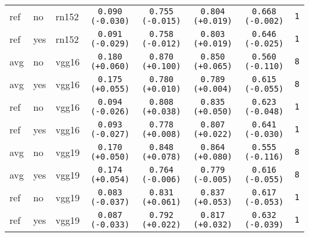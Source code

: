 \begin{tabular}{|l|l|l|c|c|c|c|c|}
ref & no & rn152 & \texttt{0.090} {\color{red}\texttt{(-0.030)}} & \texttt{0.755} {\color{green}\texttt{(-0.015)}} & \texttt{0.804} {\color{red}\texttt{(+0.019)}} & \texttt{0.668} {\color{black}\texttt{(-0.002)}} & \texttt{1}\\
ref & yes & rn152 & \texttt{0.091} {\color{red}\texttt{(-0.029)}} & \texttt{0.758} {\color{green}\texttt{(-0.012)}} & \texttt{0.803} {\color{red}\texttt{(+0.019)}} & \texttt{0.646} {\color{red}\texttt{(-0.025)}} & \texttt{1}\\
avg & no & vgg16 & \texttt{0.180} {\color{green}\texttt{(+0.060)}} & \texttt{0.870} {\color{red}\texttt{(+0.100)}} & \texttt{0.850} {\color{red}\texttt{(+0.065)}} & \texttt{0.560} {\color{red}\texttt{(-0.110)}} & \texttt{8}\\
avg & yes & vgg16 & \texttt{0.175} {\color{green}\texttt{(+0.055)}} & \texttt{0.780} {\color{red}\texttt{(+0.010)}} & \texttt{0.789} {\color{red}\texttt{(+0.004)}} & \texttt{0.615} {\color{red}\texttt{(-0.055)}} & \texttt{8}\\
ref & no & vgg16 & \texttt{0.094} {\color{red}\texttt{(-0.026)}} & \texttt{0.808} {\color{red}\texttt{(+0.038)}} & \texttt{0.835} {\color{red}\texttt{(+0.050)}} & \texttt{0.623} {\color{red}\texttt{(-0.048)}} & \texttt{1}\\
ref & yes & vgg16 & \texttt{0.093} {\color{red}\texttt{(-0.027)}} & \texttt{0.778} {\color{red}\texttt{(+0.008)}} & \texttt{0.807} {\color{red}\texttt{(+0.022)}} & \texttt{0.641} {\color{red}\texttt{(-0.030)}} & \texttt{1}\\
avg & no & vgg19 & \texttt{0.170} {\color{green}\texttt{(+0.050)}} & \texttt{0.848} {\color{red}\texttt{(+0.078)}} & \texttt{0.864} {\color{red}\texttt{(+0.080)}} & \texttt{0.555} {\color{red}\texttt{(-0.116)}} & \texttt{8}\\
avg & yes & vgg19 & \texttt{0.174} {\color{green}\texttt{(+0.054)}} & \texttt{0.764} {\color{green}\texttt{(-0.006)}} & \texttt{0.779} {\color{green}\texttt{(-0.005)}} & \texttt{0.616} {\color{red}\texttt{(-0.055)}} & \texttt{8}\\
ref & no & vgg19 & \texttt{0.083} {\color{red}\texttt{(-0.037)}} & \texttt{0.831} {\color{red}\texttt{(+0.061)}} & \texttt{0.837} {\color{red}\texttt{(+0.053)}} & \texttt{0.617} {\color{red}\texttt{(-0.053)}} & \texttt{1}\\
ref & yes & vgg19 & \texttt{0.087} {\color{red}\texttt{(-0.033)}} & \texttt{0.792} {\color{red}\texttt{(+0.022)}} & \texttt{0.817} {\color{red}\texttt{(+0.032)}} & \texttt{0.632} {\color{red}\texttt{(-0.039)}} & \texttt{1}\\

\end{tabular}
